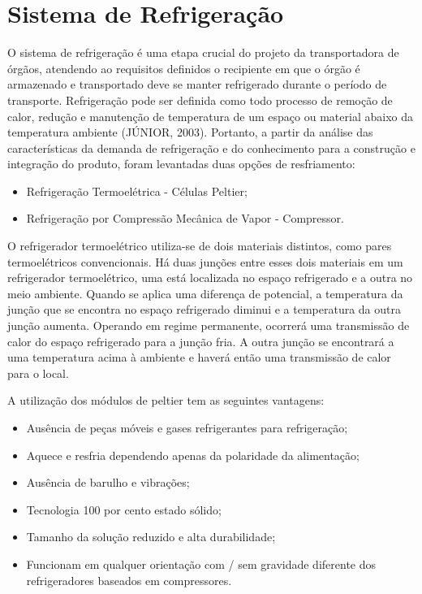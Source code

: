 \section{Sistema de Refrigeração}
O sistema de refrigeração é uma etapa crucial do projeto da transportadora de órgãos, atendendo ao requisitos definidos o recipiente em que o órgão é armazenado e transportado deve se manter refrigerado durante o período de transporte. Refrigeração pode ser definida como todo processo de remoção de calor, redução e manutenção de temperatura de um espaço ou material abaixo da temperatura ambiente (JÚNIOR, 2003). Portanto, a partir da análise das características da demanda de refrigeração e do conhecimento para a construção e integração do produto, foram levantadas duas opções de resfriamento:
	\begin{itemize}
		\item Refrigeração Termoelétrica - Células Peltier;
		\item Refrigeração por Compressão Mecânica de Vapor - Compressor.
	\end{itemize}
	
	O refrigerador termoelétrico utiliza-se de dois materiais distintos, como pares termoelétricos convencionais. Há duas junções entre esses dois materiais em um refrigerador termoelétrico, uma está localizada no espaço refrigerado e a outra no meio ambiente. Quando se aplica uma diferença de potencial, a temperatura da junção que se encontra no espaço refrigerado diminui e a temperatura da outra junção aumenta. Operando em regime permanente, ocorrerá uma transmissão de calor do espaço refrigerado para a junção fria. A outra junção se encontrará a uma temperatura acima à ambiente e haverá então uma transmissão de calor para o local.
	
	A utilização dos módulos de peltier tem as seguintes vantagens: 
	
	\begin{itemize}
		\item Ausência de peças móveis e  gases refrigerantes  para refrigeração; 
		\item Aquece e resfria dependendo apenas da polaridade da alimentação;
		\item Ausência de barulho e vibrações;
		\item Tecnologia 100 por cento estado sólido; 
		\item Tamanho da solução reduzido e alta durabilidade;
		\item Funcionam em qualquer orientação com / sem gravidade diferente dos refrigeradores baseados em compressores.
		
	\end{itemize}
	
